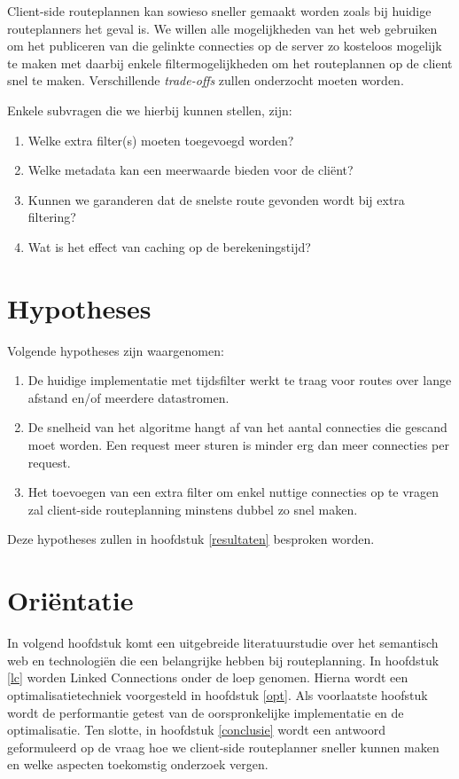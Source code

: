 Client-side routeplannen kan sowieso sneller gemaakt worden zoals bij huidige routeplanners het geval is. We willen alle mogelijkheden van het web gebruiken om het publiceren van die gelinkte connecties op de server zo kosteloos mogelijk te maken met daarbij enkele filtermogelijkheden om het routeplannen op de client snel te maken. Verschillende \textit{trade-offs} zullen onderzocht moeten worden.

Enkele subvragen die we hierbij kunnen stellen, zijn:
\begin{enumerate}
\item Welke extra filter(s) moeten toegevoegd worden?
\item Welke metadata kan een meerwaarde bieden voor de cli\"ent?
\item Kunnen we garanderen dat de snelste route gevonden wordt bij extra filtering?
\item Wat is het effect van caching op de berekeningstijd?
\end{enumerate}

\section{Hypotheses}

Volgende hypotheses zijn waargenomen:
\begin{enumerate}
\item De huidige implementatie met tijdsfilter werkt te traag voor routes over lange afstand en/of meerdere datastromen.
\item De snelheid van het algoritme hangt af van het aantal connecties die gescand moet worden. Een request meer sturen is minder erg dan meer connecties per request.
\item Het toevoegen van een extra filter om enkel nuttige connecties op te vragen zal client-side routeplanning minstens dubbel zo snel maken.
\end{enumerate}

Deze hypotheses zullen in hoofdstuk \ref{resultaten} besproken worden.

\section{Ori\"entatie}

In volgend hoofdstuk komt een uitgebreide literatuurstudie over het semantisch web en technologi\"en die een belangrijke hebben bij routeplanning. In hoofdstuk \ref{lc} worden Linked Connections onder de loep genomen. Hierna wordt een optimalisatietechniek voorgesteld in hoofdstuk \ref{opt}. Als voorlaatste hoofstuk wordt de performantie getest van de oorspronkelijke implementatie en de optimalisatie. Ten slotte, in hoofdstuk \ref{conclusie} wordt een antwoord geformuleerd op de vraag hoe we client-side routeplanner sneller kunnen maken en welke aspecten toekomstig onderzoek vergen.

